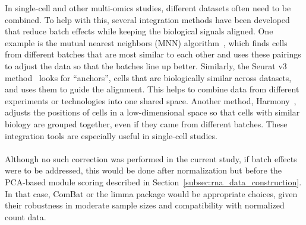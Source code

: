 \documentclass[12pt,a4paper]{report}
\begin{document}
In single-cell and other multi-omics studies, different datasets often need to be combined. To help with this, several integration methods have been developed that reduce batch effects while keeping the biological signals aligned. One example is the mutual nearest neighbors (MNN) algorithm~\cite{haghverdi2018mnn}, which finds cells from different batches that are most similar to each other and uses these pairings to adjust the data so that the batches line up better. Similarly, the Seurat v3 method~\cite{stuart2019seurat} looks for “anchors”, cells that are biologically similar across datasets, and uses them to guide the alignment. This helps to combine data from different experiments or technologies into one shared space. Another method, Harmony~\cite{korsunsky2019harmony}, adjusts the positions of cells in a low-dimensional space so that cells with similar biology are grouped together, even if they came from different batches. These integration tools are especially useful in single-cell studies.\\
\\
Although no such correction was performed in the current study, if batch effects were to be addressed, this would be done after normalization but before the PCA-based module scoring described in Section~\ref{subsec:rna_data_construction}. In that case, ComBat or the limma package would be appropriate choices, given their robustness in moderate sample sizes and compatibility with normalized count data.
\end{document}
